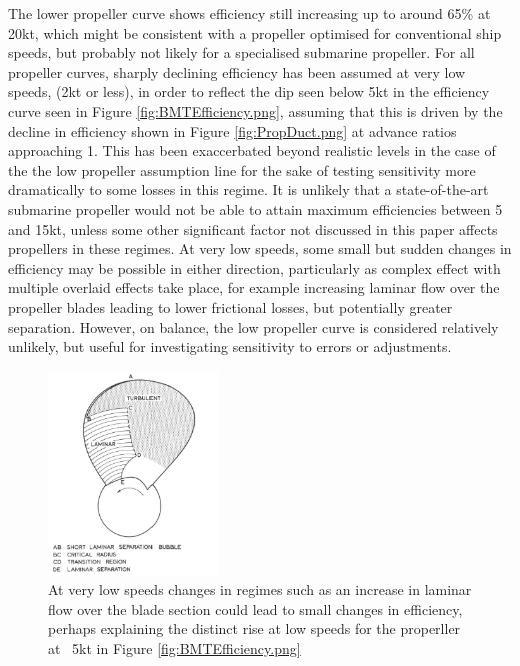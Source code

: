 \documentclass{article}\usepackage[]{graphicx}\usepackage[]{color}
\begin{document}
The lower propeller curve shows efficiency still increasing up to around 65\% at 20kt, which might be consistent with a propeller optimised for conventional ship speeds, but probably not likely for a specialised submarine propeller.  For all propeller curves, sharply declining efficiency has been assumed at very low speeds, (2kt or less), in order to reflect the dip seen below 5kt in the efficiency curve seen in Figure \ref{fig:BMTEfficiency.png}, assuming that this is driven by the decline in efficiency shown in Figure \ref{fig:PropDuct.png} at advance ratios approaching 1.  This has been exaccerbated beyond realistic levels in the case of the the low propeller assumption line for the sake of testing sensitivity more dramatically to some losses in this regime.  It is unlikely that a state-of-the-art submarine propeller would not be able to attain maximum efficiencies between 5 and 15kt, unless some other significant factor not discussed in this paper affects propellers in these regimes. At very low speeds, some small but sudden changes in efficiency may be possible in either direction, particularly as complex effect with multiple overlaid effects take place, for example increasing laminar flow over the propeller blades leading to lower frictional losses, but potentially greater separation.  However, on balance, the low propeller curve is considered relatively unlikely, but useful for investigating sensitivity to errors or adjustments.

\begin{figure}[h]
\captionsetup{width=0.4\textwidth}
\includegraphics[width=0.4\textwidth, center]{LaminarProp.png}
\caption{At very low speeds changes in regimes such as an increase in laminar flow over the blade section could lead to small changes in efficiency, perhaps explaining the distinct rise at low speeds for the properller at ~5kt in Figure \ref{fig:BMTEfficiency.png}}
\label{fig:LaminarProp.png}
\end{figure}
\end{document}
